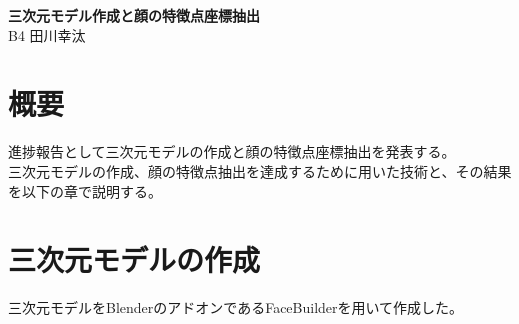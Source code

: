 \documentclass[]{jarticle}          %
\begin{document}

\vspace*{2ex}
\begin{center}
 {\Large \bf 三次元モデル作成と顔の特徴点座標抽出}\\ %
 \vspace*{5mm}
 {\large B4 田川幸汰}%
\end{center}






\section{概要}
 進捗報告として三次元モデルの作成と顔の特徴点座標抽出を発表する。 \\
 三次元モデルの作成、顔の特徴点抽出を達成するために用いた技術と、その結果を以下の章で説明する。

\section{三次元モデルの作成}
三次元モデルをBlenderのアドオンであるFaceBuilderを用いて作成した。
\end{document}
